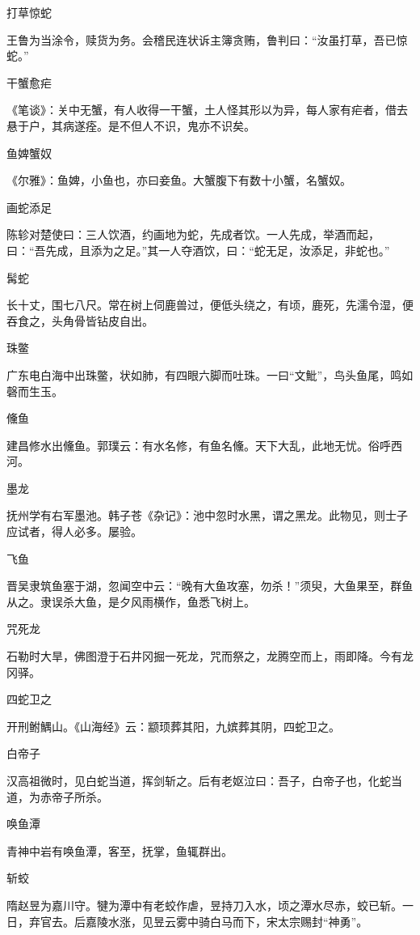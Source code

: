 \documentclass[a4paper,12pt,UTF8,twoside]{ctexbook}
\begin{document}
    打草惊蛇
    
    王鲁为当涂令，赎货为务。会稽民连状诉主簿贪贿，鲁判曰：“汝虽打草，吾已惊蛇。”
    
    干蟹愈疟
    
    《笔谈》：关中无蟹，有人收得一干蟹，土人怪其形以为异，每人家有疟者，借去悬于户，其病遂痊。是不但人不识，鬼亦不识矣。
    
    鱼婢蟹奴
    
    《尔雅》：鱼婢，小鱼也，亦曰妾鱼。大蟹腹下有数十小蟹，名蟹奴。
    
    画蛇添足
    
    陈轸对楚使曰：三人饮酒，约画地为蛇，先成者饮。一人先成，举酒而起，曰：“吾先成，且添为之足。”其一人夺酒饮，曰：“蛇无足，汝添足，非蛇也。”
    
    髯蛇
    
    长十丈，围七八尺。常在树上伺鹿兽过，便低头绕之，有顷，鹿死，先濡令湿，便吞食之，头角骨皆钻皮自出。
    
    珠鳖
    
    广东电白海中出珠鳖，状如肺，有四眼六脚而吐珠。一曰“文魮”，鸟头鱼尾，鸣如磬而生玉。
    
    儵鱼
    
    建昌修水出儵鱼。郭璞云：有水名修，有鱼名儵。天下大乱，此地无忧。俗呼西河。
    
    墨龙
    
    抚州学有右军墨池。韩子苍《杂记》：池中忽时水黑，谓之黑龙。此物见，则士子应试者，得人必多。屡验。
    
    飞鱼
    
    晋吴隶筑鱼塞于湖，忽闻空中云：“晚有大鱼攻塞，勿杀！”须臾，大鱼果至，群鱼从之。隶误杀大鱼，是夕风雨横作，鱼悉飞树上。
    
    咒死龙
    
    石勒时大旱，佛图澄于石井冈掘一死龙，咒而祭之，龙腾空而上，雨即降。今有龙冈驿。
    
    四蛇卫之
    
    开刑鲋鰅山。《山海经》云：颛顼葬其阳，九嫔葬其阴，四蛇卫之。
    
    白帝子
    
    汉高祖微时，见白蛇当道，挥剑斩之。后有老妪泣曰：吾子，白帝子也，化蛇当道，为赤帝子所杀。
    
    唤鱼潭
    
    青神中岩有唤鱼潭，客至，抚掌，鱼辄群出。
    
    斩蛟
    
    隋赵昱为嘉川守。犍为潭中有老蛟作虐，昱持刀入水，顷之潭水尽赤，蛟已斩。一日，弃官去。后嘉陵水涨，见昱云雾中骑白马而下，宋太宗赐封“神勇”。
    
\end{document}
